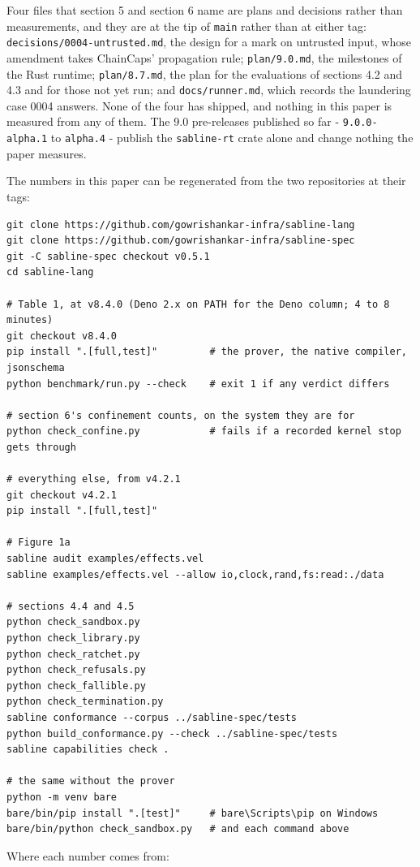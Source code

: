 \documentclass[
]{article}
\begin{document}
Four files that section 5 and section 6 name are plans and decisions
rather than measurements, and they are at the tip of \texttt{main}
rather than at either tag: \texttt{decisions/0004-untrusted.md}, the
design for a mark on untrusted input, whose amendment takes ChainCaps'
propagation rule; \texttt{plan/9.0.md}, the milestones of the Rust
runtime; \texttt{plan/8.7.md}, the plan for the evaluations of sections
4.2 and 4.3 and for those not yet run; and \texttt{docs/runner.md},
which records the laundering case 0004 answers. None of the four has
shipped, and nothing in this paper is measured from any of them. The 9.0
pre-releases published so far - \texttt{9.0.0-alpha.1} to
\texttt{alpha.4} - publish the \texttt{sabline-rt} crate alone and
change nothing the paper measures.

The numbers in this paper can be regenerated from the two repositories
at their tags:

\begin{verbatim}
git clone https://github.com/gowrishankar-infra/sabline-lang
git clone https://github.com/gowrishankar-infra/sabline-spec
git -C sabline-spec checkout v0.5.1
cd sabline-lang

# Table 1, at v8.4.0 (Deno 2.x on PATH for the Deno column; 4 to 8 minutes)
git checkout v8.4.0
pip install ".[full,test]"         # the prover, the native compiler, jsonschema
python benchmark/run.py --check    # exit 1 if any verdict differs

# section 6's confinement counts, on the system they are for
python check_confine.py            # fails if a recorded kernel stop gets through

# everything else, from v4.2.1
git checkout v4.2.1
pip install ".[full,test]"

# Figure 1a
sabline audit examples/effects.vel
sabline examples/effects.vel --allow io,clock,rand,fs:read:./data

# sections 4.4 and 4.5
python check_sandbox.py
python check_library.py
python check_ratchet.py
python check_refusals.py
python check_fallible.py
python check_termination.py
sabline conformance --corpus ../sabline-spec/tests
python build_conformance.py --check ../sabline-spec/tests
sabline capabilities check .

# the same without the prover
python -m venv bare
bare/bin/pip install ".[test]"     # bare\Scripts\pip on Windows
bare/bin/python check_sandbox.py   # and each command above
\end{verbatim}

Where each number comes from:
\end{document}
